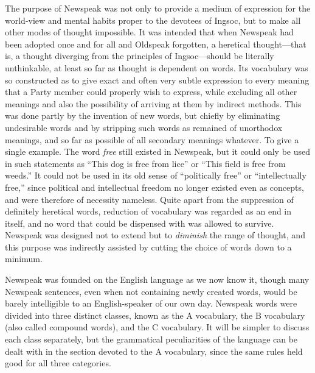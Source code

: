 The purpose of Newspeak was not only to provide a medium of expression
for the world-view and mental habits proper to the devotees of Ingsoc,
but to make all other modes of thought impossible. It was intended that
when Newspeak had been adopted once and for all and Oldspeak forgotten,
a heretical thought---that is, a thought diverging from the principles
of Ingsoc---should be literally unthinkable, at least so far as thought
is dependent on words. Its vocabulary was so constructed as to give
exact and often very subtle expression to every meaning that a Party
member could properly wish to express, while excluding all other
meanings and also the possibility of arriving at them by indirect
methods. This was done partly by the invention of new words, but chiefly
by eliminating undesirable words and by stripping such words as remained
of unorthodox meanings, and so far as possible of all secondary meanings
whatever. To give a single example. The word \emph{free} still existed
in Newspeak, but it could only be used in such statements as ``This dog
is free from lice'' or ``This field is free from weeds.'' It could not be
used in its old sense of ``politically free'' or ``intellectually free,''
since political and intellectual freedom no longer existed even as
concepts, and were therefore of necessity nameless. Quite apart from the
suppression of definitely heretical words, reduction of vocabulary was
regarded as an end in itself, and no word that could be dispensed with
was allowed to survive. Newspeak was designed not to extend but to
\emph{diminish} the range of thought, and this purpose was indirectly
assisted by cutting the choice of words down to a minimum.

Newspeak was founded on the English language as we now know it, though
many Newspeak sentences, even when not containing newly created words,
would be barely intelligible to an English-speaker of our own day.
Newspeak words were divided into three distinct classes, known as the A
vocabulary, the B vocabulary (also called compound words), and the C
vocabulary. It will be simpler to discuss each class separately, but the
grammatical peculiarities of the language can be dealt with in the
section devoted to the A vocabulary, since the same rules held good for
all three categories.

\sectionbreak

